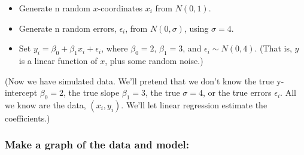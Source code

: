 \documentclass[]{article}
\providecommand{\tightlist}{%
  \setlength{\itemsep}{0pt}\setlength{\parskip}{0pt}}
\begin{document}
\begin{itemize}
\tightlist
\item
  Generate n random \(x\)-coordinates \(x_i\) from \(N(0, 1)\).
\item
  Generate n random errors, \(\epsilon_i\), from \(N(0, \sigma)\), using
  \(\sigma = 4\).
\item
  Set \(y_i = \beta_0 + \beta_1 x_i + \epsilon_i\), where
  \(\beta_0 = 2\), \(\beta_1 = 3\), and \(\epsilon_i \sim N(0, 4)\).
  (That is, \(y\) is a linear function of \(x\), plus some random
  noise.)
\end{itemize}

(Now we have simulated data. We'll pretend that we don't know the true
y-intercept \(\beta_0 = 2\), the true slope \(\beta_1 = 3\), the true
\(\sigma=4\), or the true errors \(\epsilon_i\). All we know are the
data, \((x_i, y_i)\). We'll let linear regression estimate the
coefficients.)

\subsubsection{Make a graph of the data and
model:}\label{make-a-graph-of-the-data-and-model}
\end{document}
